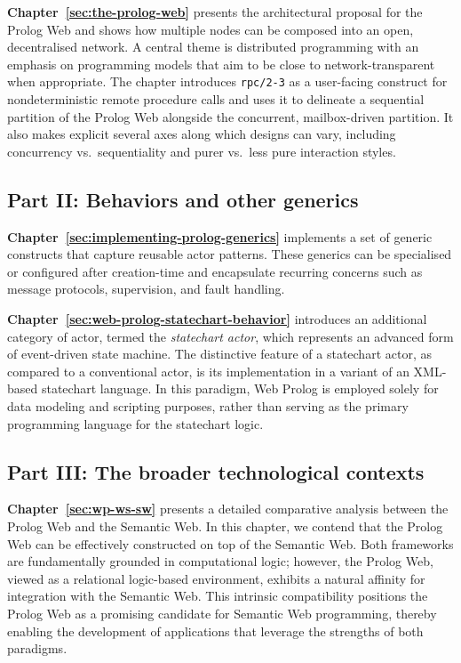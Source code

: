 \medskip
\noindent \textbf{Chapter~\ref{sec:the-prolog-web}} presents the architectural proposal for the Prolog Web and shows how multiple nodes can be composed into an open, decentralised network. A central theme is distributed programming with an emphasis on programming models that aim to be close to network-transparent when appropriate. The chapter introduces \texttt{rpc/2-3} as a user-facing construct for nondeterministic remote procedure calls and uses it to delineate a sequential partition of the Prolog Web alongside the concurrent, mailbox-driven partition. It also makes explicit several axes along which designs can vary, including concurrency vs.\ sequentiality and purer vs.\ less pure interaction styles.

\subsection*{Part II: Behaviors and other generics}

\textbf{Chapter~\ref{sec:implementing-prolog-generics}} implements a set of generic constructs that capture reusable actor patterns. These generics can be specialised or configured after creation-time and encapsulate recurring concerns such as message protocols, supervision, and fault handling.

\medskip
\noindent \textbf{Chapter~\ref{sec:web-prolog-statechart-behavior}} introduces an additional category of actor, termed the \textit{statechart actor}, which represents an advanced form of event-driven state machine. The distinctive feature of a statechart actor, as compared to a conventional actor, is its implementation in a variant of an XML-based statechart language. In this paradigm, Web Prolog is employed solely for data modeling and scripting purposes, rather than serving as the primary programming language for the statechart logic.

\subsection*{Part III: The broader technological contexts}

\textbf{Chapter~\ref{sec:wp-ws-sw}} presents a detailed comparative analysis between the Prolog Web and the Semantic Web. In this chapter, we contend that the Prolog Web can be effectively constructed on top of the Semantic Web. Both frameworks are fundamentally grounded in computational logic; however, the Prolog Web, viewed as a relational logic-based environment, exhibits a natural affinity for integration with the Semantic Web. This intrinsic compatibility positions the Prolog Web as a promising candidate for Semantic Web programming, thereby enabling the development of applications that leverage the strengths of both paradigms.

